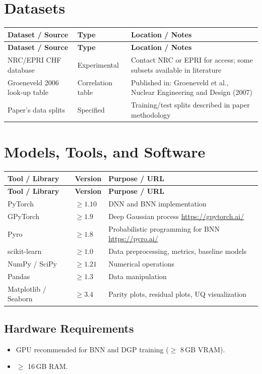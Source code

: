 \documentclass[11pt,a4paper]{article}
\begin{document}
\section{Datasets}

\begin{longtable}{p{4.5cm} p{3.5cm} p{6cm}}
\toprule
\textbf{Dataset / Source} & \textbf{Type} & \textbf{Location / Notes} \\
\midrule
\endfirsthead
\toprule
\textbf{Dataset / Source} & \textbf{Type} & \textbf{Location / Notes} \\
\midrule
\endhead
NRC/EPRI CHF database & Experimental & Contact NRC or EPRI for access; some subsets available in literature \\
\midrule
Groeneveld 2006 look-up table & Correlation table & Published in: Groeneveld et al., Nuclear Engineering and Design (2007) \\
\midrule
Paper's data splits & Specified & Training/test splits described in paper methodology \\
\bottomrule
\end{longtable}

\section{Models, Tools, and Software}

\begin{longtable}{p{4.5cm} p{2.5cm} p{6.5cm}}
\toprule
\textbf{Tool / Library} & \textbf{Version} & \textbf{Purpose / URL} \\
\midrule
\endfirsthead
\toprule
\textbf{Tool / Library} & \textbf{Version} & \textbf{Purpose / URL} \\
\midrule
\endhead
PyTorch & $\geq 1.10$ & DNN and BNN implementation \\
\midrule
GPyTorch & $\geq 1.9$ & Deep Gaussian process \newline \url{https://gpytorch.ai/} \\
\midrule
Pyro & $\geq 1.8$ & Probabilistic programming for BNN \newline \url{https://pyro.ai/} \\
\midrule
scikit-learn & $\geq 1.0$ & Data preprocessing, metrics, baseline models \\
\midrule
NumPy / SciPy & $\geq 1.21$ & Numerical operations \\
\midrule
Pandas & $\geq 1.3$ & Data manipulation \\
\midrule
Matplotlib / Seaborn & $\geq 3.4$ & Parity plots, residual plots, UQ visualization \\
\bottomrule
\end{longtable}

\subsection{Hardware Requirements}
\begin{itemize}
  \item GPU recommended for BNN and DGP training ($\geq$ 8\,GB VRAM).
  \item $\geq$ 16\,GB RAM.
\end{itemize}
\end{document}
